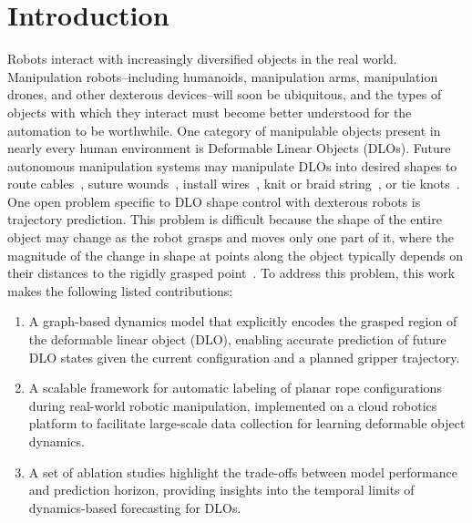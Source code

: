 \documentclass[letterpaper, 10 pt, conference]{IEEETran}
\begin{document}

\section{Introduction}
\label{sec:intro}

Robots interact with increasingly diversified objects in the real world. Manipulation robots--including humanoids, manipulation arms, manipulation drones, and other dexterous devices--will soon be ubiquitous, and the types of objects with which they interact must become better understood for the automation to be worthwhile. One category of manipulable objects present in nearly every human environment is Deformable Linear Objects (DLOs). Future autonomous manipulation systems may manipulate DLOs into desired shapes to route cables~\cite{zhou2020cable}, suture wounds~\cite{pedram2021suture}, install wires~\cite{lagneau2020shapecontrol}, knit or braid string~\cite{xiang2023multidlo}, or tie knots~\cite{lu2016dynamic, dinkel2024knotdlo}. One open problem specific to DLO shape control with dexterous robots is trajectory prediction. This problem is difficult because the shape of the entire object may change as the robot grasps and moves only one part of it, where the magnitude of the change in shape at points along the object typically depends on their distances to the rigidly grasped point~\cite{berenson2013manipulation, ruan2018rigidity}. To address this problem, this work makes the following listed contributions:

\begin{enumerate}
    \item A graph-based dynamics model that explicitly encodes the grasped region of the deformable linear object (DLO), enabling accurate prediction of future DLO states given the current configuration and a planned gripper trajectory.
    \item A scalable framework for automatic labeling of planar rope configurations during real-world robotic manipulation, implemented on a cloud robotics platform to facilitate large-scale data collection for learning deformable object dynamics.
    \item A set of ablation studies highlight the trade-offs between model performance and prediction horizon,  providing insights into the temporal limits of dynamics-based forecasting for DLOs.
\end{enumerate}
\end{document}
